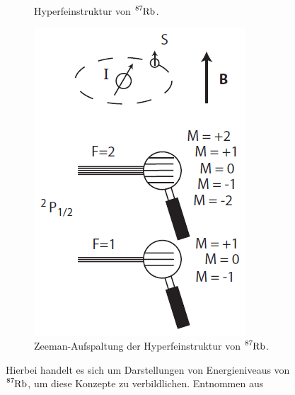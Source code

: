 \begin{figure}[htbp]
\begin{subfigure}[t]{0.26\linewidth}
            \caption{Hyperfeinstruktur von $\ce{^{87}Rb}$.}
            \label{fig:Hyperfeinstruktur}
        \end{subfigure}
        \hfill
        \begin{subfigure}[t]{0.26\linewidth}
            \centering
            \includegraphics[width = \linewidth]{pictures/Zeeman.png}
            \caption{Zeeman-Aufspaltung der Hyperfeinstruktur von $\ce{^{87}Rb}$.}
            \label{fig:Zeeman}
        \end{subfigure}
        \caption{Hierbei handelt es sich um Darstellungen von Energieniveaus von $\ce{^{87}Rb}$, um diese Konzepte zu verbildlichen. Entnommen aus \cite{httppmawebcaltecheduph77labsoptical-pumpingpdf_optical_nodate}}
    \end{figure}

    \FloatBarrier

